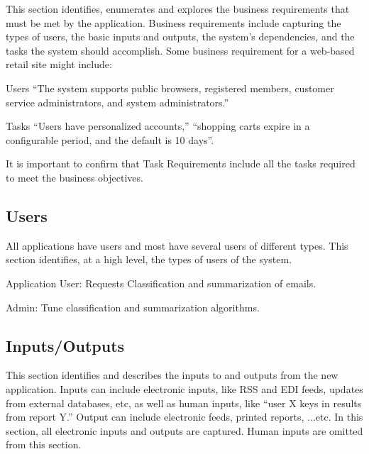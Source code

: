\documentclass[a4paper,10pt]{article}
\newenvironment{my_enumerate}
{\begin{enumerate}
  \setlength{\itemsep}{0cm}
  \setlength{\parskip}{0cm}}
{\end{enumerate}}
\newenvironment{my_description}
{\begin{description}
  \setlength{\itemsep}{0cm}
  \setlength{\parskip}{0cm}}
{\end{description}}
\begin{document}
This section identifies, enumerates and explores the business requirements that must 
be met by the application. Business requirements include capturing the types of users, 
the basic inputs and outputs, the system's dependencies, and the tasks the system should 
accomplish. Some business requirement for a web-based retail site might include:

\begin{my_description}
  \item[Users] ``The system supports public browsers, registered members, 
	      customer service administrators, and system administrators.''
  \item[Tasks] ``Users have personalized accounts,” “shopping carts expire in a configurable period, and the default is 10 days''.
\end{my_description}

It is important to confirm that Task Requirements include all the tasks required to meet the business objectives.

\subsection{Users}
All applications have users and most have several users of different types. This 
section identifies, at a high level, the types of users of the system.

\begin{my_enumerate}
  \item Application User: Requests Classification and summarization of emails.
  \item Admin: Tune classification and summarization algorithms.
\end{my_enumerate}

\subsection{Inputs/Outputs}
This section identifies and describes the inputs to and outputs from the new 
application. Inputs can include electronic inputs, like RSS and EDI feeds, 
updates from external databases, etc, as well as human inputs, like 
``user X keys in results from report Y.'' Output can include electronic feeds, 
printed reports, ...etc. In this section, all electronic inputs and outputs 
are captured. Human inputs are omitted from this section.
\end{document}
